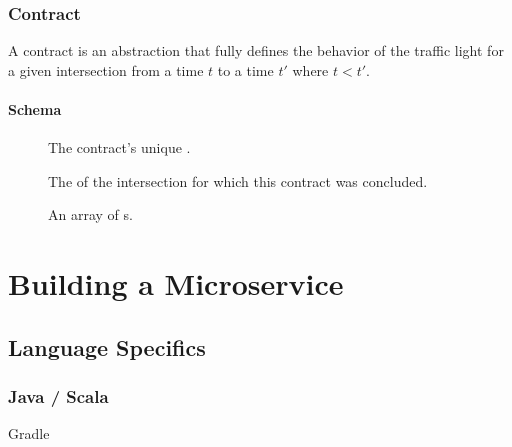 \documentclass[letterpaper,10pt,english]{sphinxmanual}
\begin{document}
\subsection{Contract}
\label{\detokenize{taxonomy_serialization:contract}}\label{\detokenize{taxonomy_serialization:id13}}
A contract is an abstraction that fully defines the behavior of the traffic light for a given intersection from a time \(t\) to a time \(t'\) where \(t < t'\).


\subsubsection{Schema}
\label{\detokenize{taxonomy_serialization:id14}}\begin{description}
\item[{}] \leavevmode
The contract’s unique {\hyperref[\detokenize{taxonomy_serialization:identifier}]{}}.

\item[{}] \leavevmode
The {\hyperref[\detokenize{taxonomy_serialization:identifier}]{}} of the intersection for which this contract was concluded.

\item[{}] \leavevmode
An array of {\hyperref[\detokenize{taxonomy_serialization:traffic-light-phase}]{}}s.

\end{description}


\chapter{Building a Microservice}
\label{\detokenize{building_a_microservice:building-a-microservice}}\label{\detokenize{building_a_microservice::doc}}

\section{Language Specifics}
\label{\detokenize{building_a_microservice:language-specifics}}

\subsection{Java / Scala}
\label{\detokenize{building_a_microservice:java-scala}}
 Gradle
\end{document}
